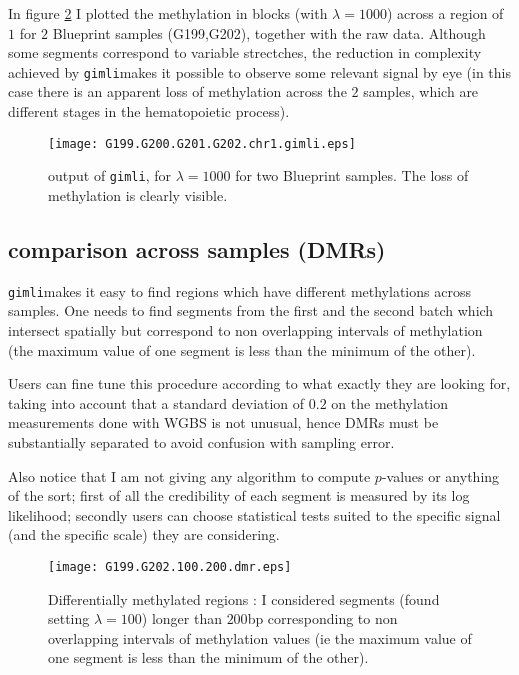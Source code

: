 \documentclass[12pt]{amsart}
\newcommand{\gimli}{\texttt{gimli}}
\begin{document}
In figure \ref{ex1} I plotted the methylation in blocks (with $\lambda=1000$) 
across a region of $1$ for $2$ Blueprint samples
(G199,G202), together with the raw data.  Although some segments
correspond to variable strectches, the reduction in complexity achieved by \gimli makes it 
possible to observe some relevant signal by eye (in this case there is 
an apparent loss of methylation across the $2$ samples, which are different 
stages in the hematopoietic process).

\begin{figure}\label{ex1}
\texttt{[image: G199.G200.G201.G202.chr1.gimli.eps]}
\caption{output of \gimli, for $\lambda=1000$ for two Blueprint samples. The loss of
methylation is clearly visible.}
\end{figure}

\subsection{comparison across samples (DMRs)}

\gimli  makes it easy to find regions which have different 
methylations across samples. One needs to find segments 
from the first and the second batch which intersect spatially
but correspond to non overlapping intervals of methylation 
(the maximum value of one 
segment is less than the minimum of the other).

Users can fine tune this procedure according to what exactly they 
are looking for, taking into account that a standard deviation of $0.2$
on the methylation measurements done with WGBS is not unusual, hence
DMRs must be substantially separated to avoid confusion with sampling error.

Also notice that I am not giving any algorithm to compute $p$-values
or anything of the sort; first of all the credibility of each segment
is measured by its log likelihood; secondly users can choose statistical
tests suited to the specific signal (and the specific scale)
they are considering.

\begin{figure}\label{ex1}
\texttt{[image: G199.G202.100.200.dmr.eps]}
\caption{Differentially methylated regions : I considered segments 
(found setting $\lambda=100$) longer than $200$bp 
corresponding to
non overlapping intervals of methylation values (ie the maximum value of one 
segment is less than the minimum of the other).}
\end{figure}
\end{document}
